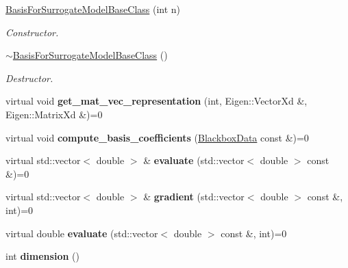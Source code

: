 \begin{DoxyCompactItemize}
\item 
\hyperlink{class_basis_for_surrogate_model_base_class_a2ef11bfe07d66270c6581929494689e4}{Basis\+For\+Surrogate\+Model\+Base\+Class} (int n)
\begin{DoxyCompactList}\small\item\em Constructor. \end{DoxyCompactList}\item 
\hyperlink{class_basis_for_surrogate_model_base_class_a651355e510770fbbd616300d3afd112b}{$\sim$\+Basis\+For\+Surrogate\+Model\+Base\+Class} ()\hypertarget{class_basis_for_surrogate_model_base_class_a651355e510770fbbd616300d3afd112b}{}\label{class_basis_for_surrogate_model_base_class_a651355e510770fbbd616300d3afd112b}

\begin{DoxyCompactList}\small\item\em Destructor. \end{DoxyCompactList}\item 
virtual void {\bfseries get\+\_\+mat\+\_\+vec\+\_\+representation} (int, Eigen\+::\+Vector\+Xd \&, Eigen\+::\+Matrix\+Xd \&)=0\hypertarget{class_basis_for_surrogate_model_base_class_afe1de780d32c6a861e1828fed97a8111}{}\label{class_basis_for_surrogate_model_base_class_afe1de780d32c6a861e1828fed97a8111}

\item 
virtual void {\bfseries compute\+\_\+basis\+\_\+coefficients} (\hyperlink{struct_blackbox_data}{Blackbox\+Data} const \&)=0\hypertarget{class_basis_for_surrogate_model_base_class_ade23ce61f959503ded709f96e589b7f9}{}\label{class_basis_for_surrogate_model_base_class_ade23ce61f959503ded709f96e589b7f9}

\item 
virtual std\+::vector$<$ double $>$ \& {\bfseries evaluate} (std\+::vector$<$ double $>$ const \&)=0\hypertarget{class_basis_for_surrogate_model_base_class_a257bfa780f2cfd4924aac5b44a195d5e}{}\label{class_basis_for_surrogate_model_base_class_a257bfa780f2cfd4924aac5b44a195d5e}

\item 
virtual std\+::vector$<$ double $>$ \& {\bfseries gradient} (std\+::vector$<$ double $>$ const \&, int)=0\hypertarget{class_basis_for_surrogate_model_base_class_ad1815a37a4d54f87c750aa3df39b06ca}{}\label{class_basis_for_surrogate_model_base_class_ad1815a37a4d54f87c750aa3df39b06ca}

\item 
virtual double {\bfseries evaluate} (std\+::vector$<$ double $>$ const \&, int)=0\hypertarget{class_basis_for_surrogate_model_base_class_a3a92947afbb7018c4e69aebb7a31aad9}{}\label{class_basis_for_surrogate_model_base_class_a3a92947afbb7018c4e69aebb7a31aad9}

\item 
int {\bfseries dimension} ()\hypertarget{class_basis_for_surrogate_model_base_class_afd4fa7760519cec7f784568911c8c07f}{}\label{class_basis_for_surrogate_model_base_class_afd4fa7760519cec7f784568911c8c07f}

\end{DoxyCompactItemize}
